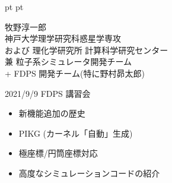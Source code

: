 \documentclass[12pt,dvipdfmx]{article}
\begin{document}
\LARGE

 pt
 pt

\date{}





{\large

\begin{center}
牧野淳一郎\\
神戸大学理学研究科惑星学専攻\\
および 理化学研究所 計算科学研究センター\\
兼 粒子系シミュレータ開発チーム\\
+ FDPS 開発チーム(特に野村昴太郎)
\leavevmode


\end{center}

}

\vfill

\hfill 2021/9/9  FDPS 講習会
 



\begin{itemize}

\item 新機能追加の歴史

\item PIKG (カーネル「自動」生成)
\item 極座標/円筒座標対応
\item 高度なシミュレーションコードの紹介

\end{itemize}

\end{document}
